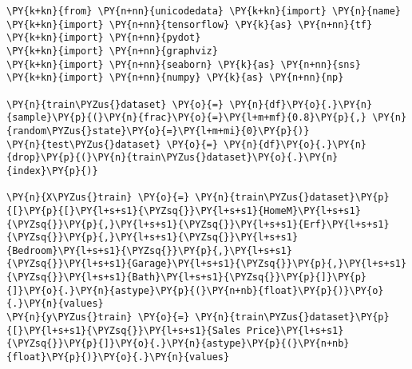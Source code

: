     \begin{tcolorbox}[breakable, size=fbox, boxrule=1pt, pad at break*=1mm,colback=cellbackground, colframe=cellborder]
\begin{Verbatim}[commandchars=\\\{\}]
\PY{k+kn}{from} \PY{n+nn}{unicodedata} \PY{k+kn}{import} \PY{n}{name}
\PY{k+kn}{import} \PY{n+nn}{tensorflow} \PY{k}{as} \PY{n+nn}{tf}
\PY{k+kn}{import} \PY{n+nn}{pydot}
\PY{k+kn}{import} \PY{n+nn}{graphviz}
\PY{k+kn}{import} \PY{n+nn}{seaborn} \PY{k}{as} \PY{n+nn}{sns}
\PY{k+kn}{import} \PY{n+nn}{numpy} \PY{k}{as} \PY{n+nn}{np}

\PY{n}{train\PYZus{}dataset} \PY{o}{=} \PY{n}{df}\PY{o}{.}\PY{n}{sample}\PY{p}{(}\PY{n}{frac}\PY{o}{=}\PY{l+m+mf}{0.8}\PY{p}{,} \PY{n}{random\PYZus{}state}\PY{o}{=}\PY{l+m+mi}{0}\PY{p}{)}
\PY{n}{test\PYZus{}dataset} \PY{o}{=} \PY{n}{df}\PY{o}{.}\PY{n}{drop}\PY{p}{(}\PY{n}{train\PYZus{}dataset}\PY{o}{.}\PY{n}{index}\PY{p}{)}

\PY{n}{X\PYZus{}train} \PY{o}{=} \PY{n}{train\PYZus{}dataset}\PY{p}{[}\PY{p}{[}\PY{l+s+s1}{\PYZsq{}}\PY{l+s+s1}{HomeM}\PY{l+s+s1}{\PYZsq{}}\PY{p}{,}\PY{l+s+s1}{\PYZsq{}}\PY{l+s+s1}{Erf}\PY{l+s+s1}{\PYZsq{}}\PY{p}{,}\PY{l+s+s1}{\PYZsq{}}\PY{l+s+s1}{Bedroom}\PY{l+s+s1}{\PYZsq{}}\PY{p}{,}\PY{l+s+s1}{\PYZsq{}}\PY{l+s+s1}{Garage}\PY{l+s+s1}{\PYZsq{}}\PY{p}{,}\PY{l+s+s1}{\PYZsq{}}\PY{l+s+s1}{Bath}\PY{l+s+s1}{\PYZsq{}}\PY{p}{]}\PY{p}{]}\PY{o}{.}\PY{n}{astype}\PY{p}{(}\PY{n+nb}{float}\PY{p}{)}\PY{o}{.}\PY{n}{values}
\PY{n}{y\PYZus{}train} \PY{o}{=} \PY{n}{train\PYZus{}dataset}\PY{p}{[}\PY{l+s+s1}{\PYZsq{}}\PY{l+s+s1}{Sales Price}\PY{l+s+s1}{\PYZsq{}}\PY{p}{]}\PY{o}{.}\PY{n}{astype}\PY{p}{(}\PY{n+nb}{float}\PY{p}{)}\PY{o}{.}\PY{n}{values}


\end{Verbatim}
\end{tcolorbox}
